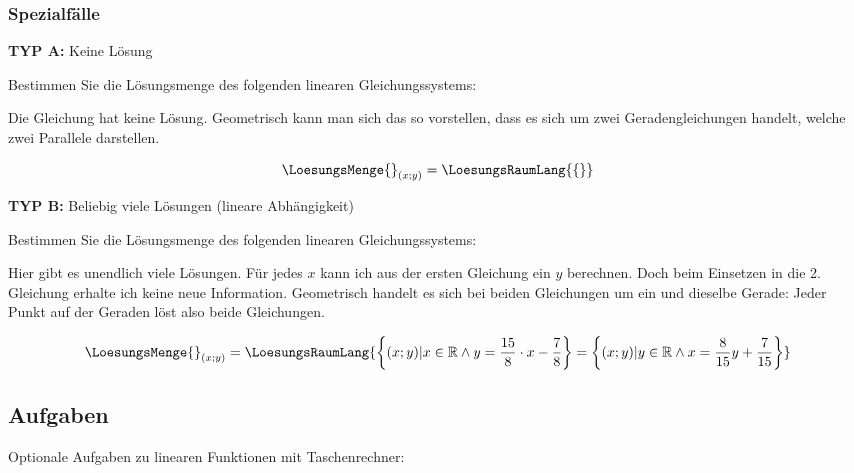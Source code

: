 \subsubsection{Spezialfälle}
\textbf{TYP A:} Keine Lösung

Bestimmen Sie die Lösungsmenge des folgenden linearen Gleichungssystems:


Die Gleichung hat keine Lösung. Geometrisch kann man sich das so vorstellen, dass es sich um zwei Geradengleichungen handelt, welche zwei Parallele darstellen.

$$\LoesungsMenge{}_{(x;y)} = \LoesungsRaumLang{\{\}}$$

\textbf{TYP B:} Beliebig viele Lösungen (lineare Abhängigkeit)

Bestimmen Sie die Lösungsmenge des folgenden linearen Gleichungssystems:


Hier gibt es unendlich viele Lösungen. Für jedes $x$ kann ich aus der ersten Gleichung ein $y$ berechnen. Doch beim Einsetzen in die 2. Gleichung erhalte ich keine neue Information.
Geometrisch handelt es sich bei beiden Gleichungen um ein und dieselbe Gerade: Jeder Punkt auf der Geraden löst also beide Gleichungen.

$$\LoesungsMenge{}_{(x;y)} = \LoesungsRaumLang{
\left\{(x;y)| x\in \mathbb{R} \land{} y = \frac{15}{8} \cdot{} x - \frac78\right\} =
\left\{(x;y)| y\in \mathbb{R} \land{} x = \frac8{15}y + \frac7{15}\right\}}$$

\newpage


\subsection*{Aufgaben}

Optionale Aufgaben zu linearen Funktionen mit Taschenrechner:

\newpage
